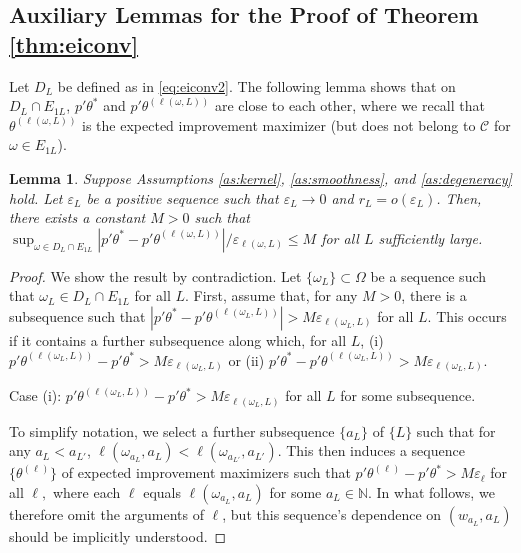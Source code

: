 \documentclass[letterpaper,11pt]{article}
\theoremstyle{myplain}
\newtheorem{lemma}{Lemma}[section]
\theoremstyle{mydefinition}
\theoremstyle{myremark}
\newcommand{\cC}{\mathcal{C}}
\numberwithin{equation}{section}
\numberwithin{figure}{section}
\begin{document}
\begin{appendix}
\subsection{Auxiliary Lemmas for the Proof of Theorem \ref{thm:eiconv}}

Let $D_L$ be defined as in \eqref{eq:eiconv2}. The following lemma shows that on $D_L\cap E_{1L}$, $p'\theta^*$ and $p'\theta^{(\ell(\omega,L))}$ are close to each other, where we recall that $\theta^{(\ell(\omega,L))}$ is the expected improvement maximizer (but does not belong to $\cC$ for $\omega \in E_{1L}$).
\begin{lemma}\label{lem:star_ell}
Suppose Assumptions \ref{as:kernel}, \ref{as:smoothness}, and \ref{as:degeneracy} hold.	Let $\varepsilon_L$ be a positive sequence such that $\varepsilon_L\to 0$ and $r_L=o(\varepsilon_L)$.
Then, there exists a constant $M>0$ such that $\sup_{\omega\in D_L\cap E_{1L}}|p'\theta^*-p'\theta^{(\ell(\omega,L))}|/\varepsilon_{\ell(\omega,L)}\le M$  for all $L$ sufficiently large.
\end{lemma}

\begin{proof}
We show the result by contradiction.
Let $\{\omega_L\}\subset\Omega$  be a  sequence such that $\omega_L\in D_L\cap E_{1L}$ for all $L$.
First, assume that, for any $M>0$, there is a  subsequence  such that $|p'\theta^*-p'\theta^{(\ell(\omega_L,L))}|> M \varepsilon_{\ell(\omega_L,L)}$ for all $L$. This occurs if it contains a further subsequence along which, for all $L$, (i) $p'\theta^{(\ell(\omega_L,L))} - p'\theta^*>M\varepsilon_{\ell(\omega_L,L)}$ or (ii) $p'\theta^*-p'\theta^{(\ell(\omega_L,L))}>M\varepsilon_{\ell(\omega_L,L)}$.


\bigskip
\noindent
Case (i): $p'\theta^{(\ell(\omega_L,L))}-p'\theta^*>M\varepsilon_{\ell(\omega_L,L)}$ for all $L$ for some subsequence.

To simplify notation, we select a further subsequence $\{a_L\}$ of $\{L\}$  such that
for any $a_L<a_{L'}$, $\ell(\omega_{a_L},a_L)<\ell(\omega_{a_{L'}},a_{L'})$. This then  induces a sequence $\{\theta^{(\ell)}\}$ of expected improvement maximizers such that  $p'\theta^{(\ell)}-p'\theta^*>M\varepsilon_\ell$ for all $\ell,$ where each $\ell$ equals $\ell(\omega_{a_L},a_L)$ for some $a_L\in\mathbb N$. In what follows, we therefore omit the arguments of $\ell$, but this sequence's dependence on $(w_{a_L},a_L)$ should be implicitly understood.


\end{proof}
\end{appendix}
\end{document}
